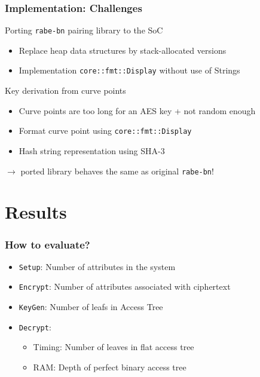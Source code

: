 \begin{frame}[c, fragile]
    \frametitle{Implementation: Challenges}
    \begin{block}{Porting \texttt{rabe-bn} pairing library to the SoC}
        \begin{itemize}
            \item Replace heap data structures by stack-allocated versions
            \item Implementation \verb+core::fmt::Display+ without use of Strings
        \end{itemize}
    \end{block}
    \begin{block}{Key derivation from curve points}
        \begin{itemize}
            \item Curve points are too long for an AES key + not random enough
            \item Format curve point using \verb+core::fmt::Display+
            \item Hash string representation using SHA-3
        \end{itemize}
    \end{block}
    \begin{center}
        \alert{\large $\rightarrow$ ported library behaves the same as original \texttt{rabe-bn}!}
    \end{center}
\end{frame}

\section{Results}

\begin{frame}[c]
    \frametitle{How to evaluate?}
    \begin{minipage}{.59\textwidth}
        \begin{itemize}
            \item \texttt{Setup}: Number of attributes in the system
            \item \texttt{Encrypt}: Number of attributes associated with ciphertext
            \item \texttt{KeyGen}: Number of leafs in Access Tree
            \item \texttt{Decrypt}: \begin{itemize}
                \item Timing: Number of leaves in flat access tree
                \item RAM: Depth of perfect binary access tree
            \end{itemize}
        \end{itemize}
    \end{minipage}
    \begin{minipage}{.4\textwidth}
        
    \end{minipage}
\end{frame}

